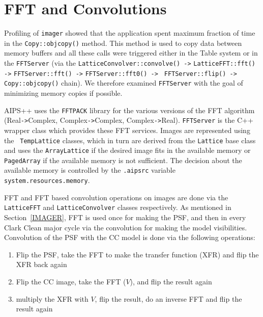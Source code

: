 \section{FFT and Convolutions}
\label{FFT_CONVOLVE}

Profiling of {\tt imager} showed that the application spent maximum
fraction of time in the {\tt Copy::objcopy()} method.  This method is
used to copy data between memory buffers and all these calls were
triggered either in the Table system or in the {\tt FFTServer} (via
the {\tt LatticeConvolver::convolve() ->} {\tt LatticeFFT::fft() ->}
{\tt FFTServer::fft() ->} {\tt FFTServer::fft0() ->} {\tt
FFTServer::flip() ->} {\tt Copy::objcopy()} chain).  We therefore
examined {\tt FFTServer} with the goal of minimizing memory copies if
possible.

AIPS++ uses the {\tt FFTPACK} library for the various versions of the
FFT algorithm (Real{\tt->}Complex, Complex{\tt->}Complex,
Complex{\tt->}Real).  {\tt FFTServer} is the C++ wrapper class which
provides these FFT services.  Images are represented using the {\tt
TempLattice} classes, which in turn are derived from the {\tt Lattice}
base class and uses the {\tt ArrayLattice} if the desired image fits
in the available memory or {\tt PagedArray} if the available memory is
not sufficient.  The decision about the available memory is controlled
by the {\tt .aipsrc} variable {\tt system.resources.memory}.

FFT and FFT based convolution operations on images are done via the
{\tt LatticeFFT} and {\tt LatticeConvolver} classes respectively.  As
mentioned in Section~\ref{IMAGER}, FFT is used once for making the
PSF, and then in every Clark Clean major cycle via the convolution for
making the model visibilities.  Convolution of the PSF with the CC
model is done via the following operations:

\begin{enumerate}

\item Flip the PSF, take the FFT to make the transfer function (XFR)
and flip the XFR back again
\label{F1}

\item Flip the CC image, take the FFT ($V$), and flip the
result again
\label{F2}

\item multiply the XFR with $V$, flip the result, do an inverse
FFT and flip the result again
\end{enumerate}

